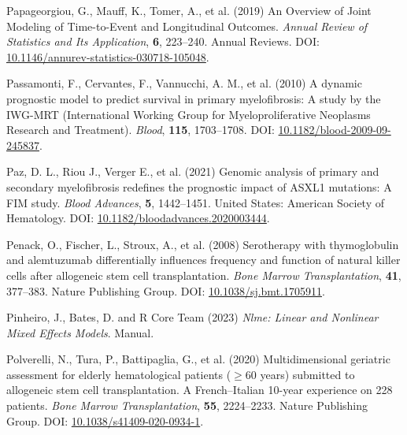 \documentclass[
  letterpaper,
  paper=240mm:170mm,
  twoside=true,
  open=right,
  fontsize=10pt,
  pagesize=false,
  BCOR=15mm,
  DIV=14,
  headinclude=true,
  footinclude=false,
  headsepline=on]{scrbook}
\newlength{\cslhangindent}
\newenvironment{CSLReferences}[2] %
 {\begin{list}{}{%
  \setlength{\itemindent}{0pt}
  \setlength{\leftmargin}{0pt}
  \setlength{\parsep}{0pt}
  \ifodd #1
   \setlength{\leftmargin}{\cslhangindent}
   \setlength{\itemindent}{-1\cslhangindent}
  \fi
  \setlength{\itemsep}{#2\baselineskip}}}
 {\end{list}}
\begin{document}
\begin{CSLReferences}{1}{1}
Papageorgiou, G., Mauff, K., Tomer, A., et al. (2019) An {Overview} of
{Joint Modeling} of {Time-to-Event} and {Longitudinal Outcomes}.
\emph{Annual Review of Statistics and Its Application}, \textbf{6},
223--240. Annual Reviews. DOI:
\href{https://doi.org/10.1146/annurev-statistics-030718-105048}{10.1146/annurev-statistics-030718-105048}.

Passamonti, F., Cervantes, F., Vannucchi, A. M., et al. (2010) A dynamic
prognostic model to predict survival in primary myelofibrosis: A study
by the {IWG-MRT} ({International Working Group} for {Myeloproliferative
Neoplasms Research} and {Treatment}). \emph{Blood}, \textbf{115},
1703--1708. DOI:
\href{https://doi.org/10.1182/blood-2009-09-245837}{10.1182/blood-2009-09-245837}.

Paz, D. L., Riou J., Verger E., et al. (2021) Genomic analysis of
primary and secondary myelofibrosis redefines the prognostic impact of
{ASXL1} mutations: {A FIM} study. \emph{Blood Advances}, \textbf{5},
1442--1451. United States: American Society of Hematology. DOI:
\href{https://doi.org/10.1182/bloodadvances.2020003444}{10.1182/bloodadvances.2020003444}.

Penack, O., Fischer, L., Stroux, A., et al. (2008) Serotherapy with
thymoglobulin and alemtuzumab differentially influences frequency and
function of natural killer cells after allogeneic stem cell
transplantation. \emph{Bone Marrow Transplantation}, \textbf{41},
377--383. Nature Publishing Group. DOI:
\href{https://doi.org/10.1038/sj.bmt.1705911}{10.1038/sj.bmt.1705911}.

Pinheiro, J., Bates, D. and R Core Team (2023) \emph{Nlme: {Linear} and
Nonlinear Mixed Effects Models}. Manual.

Polverelli, N., Tura, P., Battipaglia, G., et al. (2020)
Multidimensional geriatric assessment for elderly hematological patients
({\(\geq\)}60 years) submitted to allogeneic stem cell transplantation.
{A French}--{Italian} 10-year experience on 228 patients. \emph{Bone
Marrow Transplantation}, \textbf{55}, 2224--2233. Nature Publishing
Group. DOI:
\href{https://doi.org/10.1038/s41409-020-0934-1}{10.1038/s41409-020-0934-1}.


\end{CSLReferences}
\end{document}
